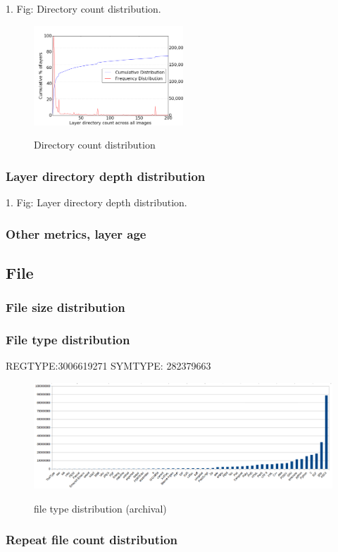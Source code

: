 1. Fig: Directory count distribution.

\begin{figure}
	\centering
	\includegraphics[width=0.5\textwidth]{graphs/Layer_directory_count_across_all_images.png}\\
	\caption{Directory count distribution}\label{fig_image_size_compression}
\end{figure}

\subsubsection{Layer directory depth distribution}

1. Fig: Layer directory depth distribution.


\subsubsection{Other metrics, layer age}

\subsection{File}


\subsubsection{File size distribution}

\subsubsection{File type distribution}

REGTYPE:3006619271
SYMTYPE: 282379663

\begin{figure}
	\centering
	\includegraphics[width=1\textwidth]{graphs/file_type.png}\\
	\caption{file type distribution (archival)}\label{xxx}
\end{figure}

\subsubsection{Repeat file count distribution}
